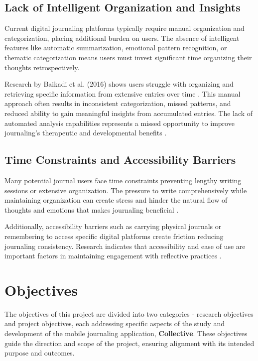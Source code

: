\subsection{Lack of Intelligent Organization and Insights}\label{subsec:lack-intelligence}

Current digital journaling platforms typically require manual organization and categorization, placing additional burden on users. The absence of intelligent features like automatic summarization, emotional pattern recognition, or thematic categorization means users must invest significant time organizing their thoughts retrospectively.

Research by Baikadi et al. (2016) shows users struggle with organizing and retrieving specific information from extensive entries over time \cite{baikadi2016exploring}. This manual approach often results in inconsistent categorization, missed patterns, and reduced ability to gain meaningful insights from accumulated entries. The lack of automated analysis capabilities represents a missed opportunity to improve journaling's therapeutic and developmental benefits \cite{allahyari2017text}.

\subsection{Time Constraints and Accessibility Barriers}\label{subsec:time-constraints}

Many potential journal users face time constraints preventing lengthy writing sessions or extensive organization. The pressure to write comprehensively while maintaining organization can create stress and hinder the natural flow of thoughts and emotions that makes journaling beneficial \cite{pennebaker1999forming}.

Additionally, accessibility barriers such as carrying physical journals or remembering to access specific digital platforms create friction reducing journaling consistency. Research indicates that accessibility and ease of use are important factors in maintaining engagement with reflective practices \cite{sloan2015efficacy}.

\section{Objectives}\label{sec:objectives}

The objectives of this project are divided into two categories - research objectives and project objectives, each addressing specific aspects of the study and development of the mobile journaling application, \textbf{Collective}. These objectives guide the direction and scope of the project, ensuring alignment with its intended purpose and outcomes.

